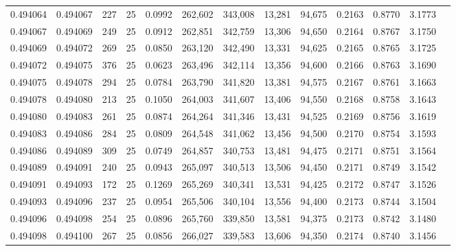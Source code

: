 \begin{tabular}{rrrrrrrrrrrrr}
0.494064 & 0.494067 &   227 &  25 &                                     0.0992 & 262,602 & 343,008 &  13,281 &  94,675 & 0.2163 & 0.8770 & 3.1773 \\
0.494067 & 0.494069 &   249 &  25 &                                     0.0912 & 262,851 & 342,759 &  13,306 &  94,650 & 0.2164 & 0.8767 & 3.1750 \\
0.494069 & 0.494072 &   269 &  25 &                                     0.0850 & 263,120 & 342,490 &  13,331 &  94,625 & 0.2165 & 0.8765 & 3.1725 \\
0.494072 & 0.494075 &   376 &  25 &                                     0.0623 & 263,496 & 342,114 &  13,356 &  94,600 & 0.2166 & 0.8763 & 3.1690 \\
0.494075 & 0.494078 &   294 &  25 &                                     0.0784 & 263,790 & 341,820 &  13,381 &  94,575 & 0.2167 & 0.8761 & 3.1663 \\
0.494078 & 0.494080 &   213 &  25 &                                     0.1050 & 264,003 & 341,607 &  13,406 &  94,550 & 0.2168 & 0.8758 & 3.1643 \\
0.494080 & 0.494083 &   261 &  25 &                                     0.0874 & 264,264 & 341,346 &  13,431 &  94,525 & 0.2169 & 0.8756 & 3.1619 \\
0.494083 & 0.494086 &   284 &  25 &                                     0.0809 & 264,548 & 341,062 &  13,456 &  94,500 & 0.2170 & 0.8754 & 3.1593 \\
0.494086 & 0.494089 &   309 &  25 &                                     0.0749 & 264,857 & 340,753 &  13,481 &  94,475 & 0.2171 & 0.8751 & 3.1564 \\
0.494089 & 0.494091 &   240 &  25 &                                     0.0943 & 265,097 & 340,513 &  13,506 &  94,450 & 0.2171 & 0.8749 & 3.1542 \\
0.494091 & 0.494093 &   172 &  25 &                                     0.1269 & 265,269 & 340,341 &  13,531 &  94,425 & 0.2172 & 0.8747 & 3.1526 \\
0.494093 & 0.494096 &   237 &  25 &                                     0.0954 & 265,506 & 340,104 &  13,556 &  94,400 & 0.2173 & 0.8744 & 3.1504 \\
0.494096 & 0.494098 &   254 &  25 &                                     0.0896 & 265,760 & 339,850 &  13,581 &  94,375 & 0.2173 & 0.8742 & 3.1480 \\
0.494098 & 0.494100 &   267 &  25 &                                     0.0856 & 266,027 & 339,583 &  13,606 &  94,350 & 0.2174 & 0.8740 & 3.1456 \\

\end{tabular}
